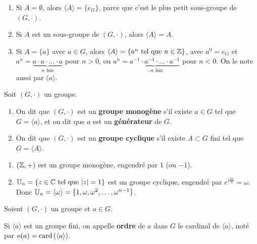 \documentclass[12pt, a4paper]{report}
\begin{document}
\begin{example}
    \begin{enumerate}
        \item Si $A = \emptyset$, alors $\langle A \rangle = \{e_G\}$, parce que c'est le plus petit sous-groupe de $(G,\cdot)$.
        \item Si $A$ est un sous-groupe de $(G,\cdot)$, alors $\langle A \rangle = A$.
        \item Si $A=\{a\}$ avec $a \in G$, alors $\langle A \rangle = \{a^n \text{ tel que } n \in \mathbb{Z}\}$, avec $a^0 = e_G$ et $a^n = \underbrace{a \cdot a \cdot \ldots \cdot a}_{n \text{ fois}}$ pour $n > 0$, ou $a^n = \underbrace{a^{-1} \cdot a^{-1} \cdot \ldots \cdot a^{-1}}_{-n \text{ fois}}$ pour $n < 0$. On le note aussi par $\langle a \rangle$.
    \end{enumerate}
\end{example}

\begin{definition}
    Soit $(G,\cdot)$ un groupe.
    \begin{enumerate}
        \item On dit que $(G,\cdot)$ est un \textbf{groupe monogène} s'il existe $a \in G$ tel que $G = \langle a \rangle$, et on dit que $a$ est un \textbf{générateur} de $G$.
        \item On dit que $(G,\cdot)$ est un \textbf{groupe cyclique} s'il existe $A \subset G$ fini tel que $G = \langle A \rangle$.
    \end{enumerate}
\end{definition}

\begin{example}
    \begin{enumerate}
        \item $(\mathbb{Z},+)$ est un groupe monogène, engendré par $1$ (ou $-1$).
        \item $\mathbb{U}_n = \{z \in \mathbb{C} \text{ tel que } |z| = 1\}$ est un groupe cyclique, engendré par $e^{i\frac{2\pi}{n}}=\omega$. Donc $\mathbb{U}_n = \langle \omega \rangle = \{1, \omega, \omega^2, \ldots, \omega^{n-1}\}$.
    \end{enumerate}
\end{example}

\begin{definition}
    Soient $(G,\cdot)$ un groupe et $a \in G$.

    Si $\langle a \rangle$ est un groupe fini, on appelle \textbf{ordre} de $a$ dans $G$ le cardinal de $\langle a \rangle$, noté par $o(a)=\mathrm{card}\left(\langle a \rangle\right)$.
\end{definition}
\end{document}
